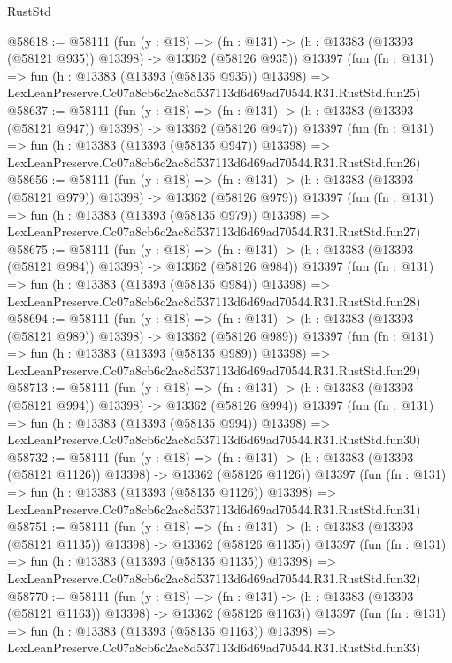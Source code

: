 \begin{lexlean}{RustStd}
\begin{coremodule}
@58618 := @58111
    (fun (y : @18) =>
    (fn : @131) -> (h : @13383 (@13393 (@58121 @935)) @13398) -> @13362 (@58126 @935))
    @13397
    (fun (fn : @131) =>
    fun (h : @13383 (@13393 (@58135 @935)) @13398) =>
    LexLeanPreserve.Cc07a8cb6c2ac8d537113d6d69ad70544.R31.RustStd.fun25)
@58637 := @58111
    (fun (y : @18) =>
    (fn : @131) -> (h : @13383 (@13393 (@58121 @947)) @13398) -> @13362 (@58126 @947))
    @13397
    (fun (fn : @131) =>
    fun (h : @13383 (@13393 (@58135 @947)) @13398) =>
    LexLeanPreserve.Cc07a8cb6c2ac8d537113d6d69ad70544.R31.RustStd.fun26)
@58656 := @58111
    (fun (y : @18) =>
    (fn : @131) -> (h : @13383 (@13393 (@58121 @979)) @13398) -> @13362 (@58126 @979))
    @13397
    (fun (fn : @131) =>
    fun (h : @13383 (@13393 (@58135 @979)) @13398) =>
    LexLeanPreserve.Cc07a8cb6c2ac8d537113d6d69ad70544.R31.RustStd.fun27)
@58675 := @58111
    (fun (y : @18) =>
    (fn : @131) -> (h : @13383 (@13393 (@58121 @984)) @13398) -> @13362 (@58126 @984))
    @13397
    (fun (fn : @131) =>
    fun (h : @13383 (@13393 (@58135 @984)) @13398) =>
    LexLeanPreserve.Cc07a8cb6c2ac8d537113d6d69ad70544.R31.RustStd.fun28)
@58694 := @58111
    (fun (y : @18) =>
    (fn : @131) -> (h : @13383 (@13393 (@58121 @989)) @13398) -> @13362 (@58126 @989))
    @13397
    (fun (fn : @131) =>
    fun (h : @13383 (@13393 (@58135 @989)) @13398) =>
    LexLeanPreserve.Cc07a8cb6c2ac8d537113d6d69ad70544.R31.RustStd.fun29)
@58713 := @58111
    (fun (y : @18) =>
    (fn : @131) -> (h : @13383 (@13393 (@58121 @994)) @13398) -> @13362 (@58126 @994))
    @13397
    (fun (fn : @131) =>
    fun (h : @13383 (@13393 (@58135 @994)) @13398) =>
    LexLeanPreserve.Cc07a8cb6c2ac8d537113d6d69ad70544.R31.RustStd.fun30)
@58732 := @58111
    (fun (y : @18) =>
    (fn : @131) -> (h : @13383 (@13393 (@58121 @1126)) @13398) -> @13362 (@58126 @1126))
    @13397
    (fun (fn : @131) =>
    fun (h : @13383 (@13393 (@58135 @1126)) @13398) =>
    LexLeanPreserve.Cc07a8cb6c2ac8d537113d6d69ad70544.R31.RustStd.fun31)
@58751 := @58111
    (fun (y : @18) =>
    (fn : @131) -> (h : @13383 (@13393 (@58121 @1135)) @13398) -> @13362 (@58126 @1135))
    @13397
    (fun (fn : @131) =>
    fun (h : @13383 (@13393 (@58135 @1135)) @13398) =>
    LexLeanPreserve.Cc07a8cb6c2ac8d537113d6d69ad70544.R31.RustStd.fun32)
@58770 := @58111
    (fun (y : @18) =>
    (fn : @131) -> (h : @13383 (@13393 (@58121 @1163)) @13398) -> @13362 (@58126 @1163))
    @13397
    (fun (fn : @131) =>
    fun (h : @13383 (@13393 (@58135 @1163)) @13398) =>
    LexLeanPreserve.Cc07a8cb6c2ac8d537113d6d69ad70544.R31.RustStd.fun33)

\end{coremodule}
\end{lexlean}

